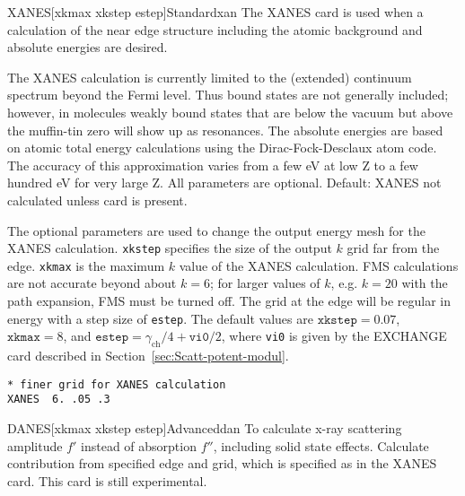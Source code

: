 \documentclass[11pt,oneside]{report} %
\begin{document}
\begin{Card}{XANES}{[xkmax xkstep estep]}{Standard}{xan}
  The XANES card is used when a calculation of the near edge structure
  including the atomic background and absolute energies are desired.

  The XANES calculation is currently limited to the (extended) continuum
  spectrum beyond the Fermi level. Thus bound states are not generally
  included; however, in molecules weakly bound states that are below the
  vacuum but above the muffin-tin zero will show up as resonances.  The
  absolute energies are based on atomic total energy calculations
  using the Dirac-Fock-Desclaux atom code.  The accuracy of this approximation
  varies from a few eV at low Z to a few hundred eV for very large Z.
  All parameters are optional.  Default: XANES not calculated unless
  card is present.

  The optional parameters are used to change the output energy mesh
  for the XANES calculation.  \texttt{xkstep} specifies the size of
  the output $k$ grid far from the edge.  \texttt{xkmax} is the
  maximum $k$ value of the XANES calculation. FMS calculations
  are not accurate beyond about $k=6$; for larger values of $k$, e.g.
  $k=20$ with the path expansion, FMS must be turned off.  The grid at the edge
  will be regular in energy with a step size of \texttt{estep}.  The
  default values are $\mathtt{xkstep}=0.07$, $\mathtt{xkmax}=8$, and
  $\mathtt{estep}= \gamma_{\mathrm{ch}}/4+\mathtt{vi0}/2$, where
  \texttt{vi0} is given by the EXCHANGE card described in
  Section~\ref{sec:Scatt-potent-modul}.

\begin{verbatim}
* finer grid for XANES calculation
XANES  6. .05 .3
\end{verbatim}
\end{Card}

\begin{Card}{DANES}{[xkmax xkstep estep]}{Advanced}{dan}
  To calculate x-ray scattering amplitude $f'$ instead of absorption $f''$, 
  including solid state effects. Calculate contribution from specified
  edge and grid, which is specified as in the XANES card.
  This card is still experimental.
\end{Card}
 
\end{document}
